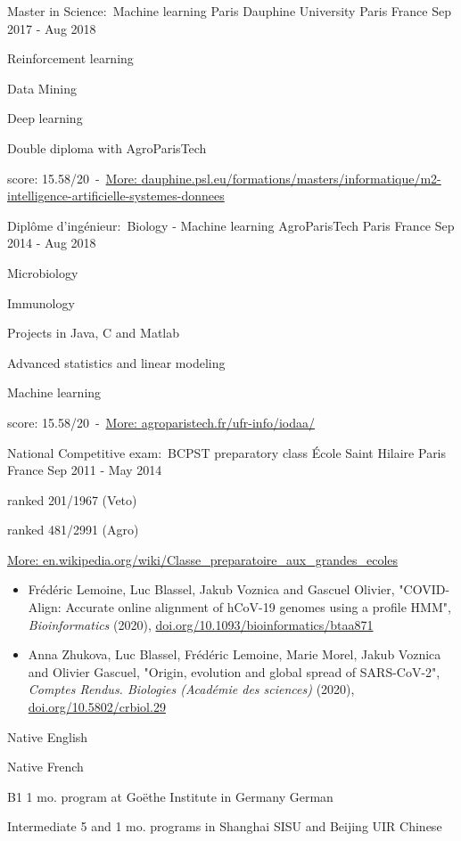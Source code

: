 \documentclass[11pt, a4paper]{awesome-cv}
\begin{document}
\begin{cventries}
\cventry
{Master in Science:~Machine learning}
{Paris Dauphine University}
{Paris France}
{Sep 2017 - Aug 2018}
{
\begin{cvitems}
\item{Reinforcement learning}
\item{Data Mining}
\item{Deep learning}
\item{Double diploma with AgroParisTech}
\item{score: 15.58/20~-~\href{https://dauphine.psl.eu/formations/masters/informatique/m2-intelligence-artificielle-systemes-donnees}{More: \tiny{dauphine.psl.eu/formations/masters/informatique/m2-intelligence-artificielle-systemes-donnees}}}
\end{cvitems}
}


\cventry
{Diplôme d'ingénieur:~Biology - Machine learning}
{AgroParisTech}
{Paris France}
{Sep 2014 - Aug 2018}
{
\begin{cvitems}
\item{Microbiology}
\item{Immunology}
\item{Projects in Java, C and Matlab}
\item{Advanced statistics and linear modeling}
\item{Machine learning}
\item{score: 15.58/20~-~\href{http://www.agroparistech.fr/ufr-info/iodaa/}{More: \tiny{agroparistech.fr/ufr-info/iodaa/}}}
\end{cvitems}
}


\cventry
{National Competitive exam:~BCPST preparatory class}
{École Saint Hilaire}
{Paris France}
{Sep 2011 - May 2014}
{
\begin{cvitems}
\item{ranked 201/1967 (Veto)}
\item{ranked 481/2991 (Agro)}
\item{\href{https://en.wikipedia.org/wiki/Classe_preparatoire_aux_grandes_ecoles}{More: \tiny{en.wikipedia.org/wiki/Classe\_preparatoire\_aux\_grandes\_ecoles}}}
\end{cvitems}
}
\end{cventries}
\begin{itemize}
\item Frédéric Lemoine, Luc Blassel, Jakub Voznica and Gascuel Olivier, "COVID-Align: Accurate online alignment of hCoV-19 genomes using a profile HMM", \textit{Bioinformatics} (2020), \href{https://doi.org/10.1093/bioinformatics/btaa871}{\tiny{doi.org/10.1093/bioinformatics/btaa871}}

\item Anna Zhukova, Luc Blassel, Frédéric Lemoine, Marie Morel, Jakub Voznica and Olivier Gascuel, "Origin, evolution and global spread of SARS-CoV-2", \textit{Comptes Rendus. Biologies (Académie des sciences)} (2020), \href{https://doi.org/10.5802/crbiol.29}{\tiny{doi.org/10.5802/crbiol.29}}
\end{itemize}

\begin{cvhonors}
\cvhonor
{Native}
{}
{}
{English}

\cvhonor
{Native}
{}
{}
{French}

\cvhonor
{B1}
{1 mo. program at Goëthe Institute in Germany}
{}
{German}

\cvhonor
{Intermediate}
{5 and 1 mo. programs in Shanghai SISU and Beijing UIR}
{}
{Chinese}
\end{cvhonors}
\end{document}
